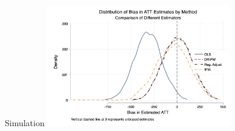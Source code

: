 \documentclass{beamer}
\begin{document}
\begin{frame}{Simulation}
    \centering
    \includegraphics[width=0.6\textwidth]{./lecture_includes/covariates.jpg}
\end{frame}
\end{document}
